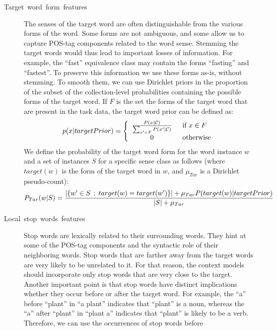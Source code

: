 \documentclass[english]{jnlp_1.4}
\begin{document}
\begin{description}
\item [{Target~word~form~features}] The senses of the target word are
often distinguishable from the various forms of the word. Some forms
are not ambiguous, and some allow us to capture POS-tag components
related to the word sense. Stemming the target words would thus lead
to important losses of information. For example, the {}``fast''
equivalence class may contain the forms {}``fasting'' and {}``fastest''.
To preserve this information we use these forms as-is, without stemming.
To smooth them, we can use Dirichlet priors in the proportion of the
subset of the collection-level probabilities containing the possible
forms of the target word. If $F$ is the set the forms of the target
word that are present in the task data, the target word prior can
be defined as:
\[
p(x|targetPrior)=\left\{ \begin{array}{cl}
\frac{P(x|\mathcal{C})}{\sum_{x^{\prime}\in F}P(x^{\prime}|\mathcal{C})} & \mbox{\,\ if \ensuremath{x\in F}}\\
0 & \mbox{\,\ otherwise}\end{array}\right.
\]
We defi{}ne the probability of the target word form for the word instance
$w$ and a set of instances $S$ for a specific sense class as follows
(where $target(w)$ is the form of the target word in $w$, and $\mu_{Tar}$
is a Dirichlet pseudo-count):
\[
P_{Tar}(w|S)=\frac{\left|\left\{ w^{\prime}\in S\,:\, target(w)=target(w^{\prime})\right\} \right|+\mu_{Tar}P(target(w)|targetPrior)}{\left|\vphantom{target(w^{\prime})}S\right|+\mu_{Tar}}
\]
\item [{Local~stop~words~features}] Stop words are lexically related
to their surrounding words. They hint at some of the POS-tag components
and the syntactic role of their neighboring words. Stop words that
are farther away from the target words are very likely to be unrelated
to it. For that reason, the context models should incorporate only
stop words that are very close to the target. Another important point
is that stop words have distinct implications whether they occur before
or after the target word. For example, the \textquotedblleft{}a\textquotedblright{}
before \textquotedblleft{}plant\textquotedblright{} in \textquotedblleft{}a
plant\textquotedblright{} indicates that \textquotedblleft{}plant\textquotedblright{}
is a noun, whereas the {}``a'' after {}``plant'' in \textquotedblleft{}plant
a\textquotedblright{} indicates that {}``plant'' is likely to be
a verb. Therefore, we can use the occurrences of stop words before

\end{description}
\end{document}
